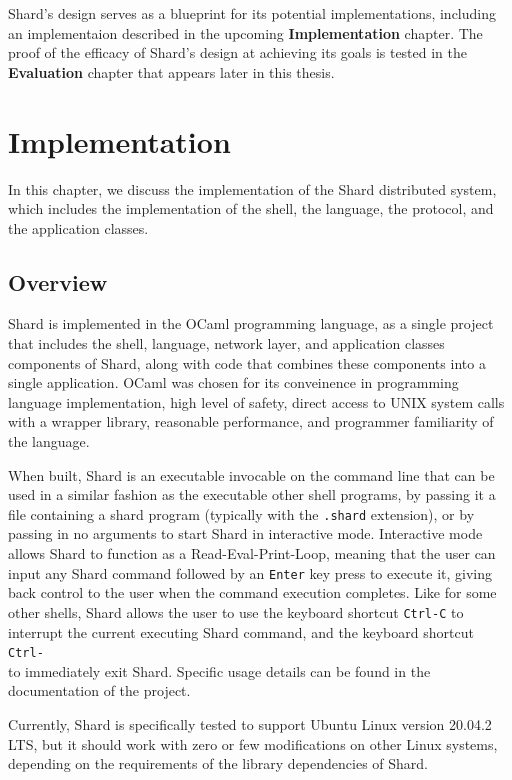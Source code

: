 \documentclass[twoside]{report}
\begin{document}
Shard's design serves as a blueprint for its potential implementations, including an implementaion described in the upcoming \textbf{Implementation} chapter.
The proof of the efficacy of Shard's design at achieving its goals is tested in the \textbf{Evaluation} chapter that appears later in this thesis.


\chapter{Implementation}

In this chapter, we discuss the implementation of the Shard distributed system, which includes the implementation of the shell, the language, the protocol, and the application classes.

\section{Overview}

Shard is implemented in the OCaml programming language, as a single project that includes the shell, language, network layer, and application classes components of Shard, along with code that combines these components into a single application.
OCaml was chosen for its conveinence in programming language implementation, high level of safety, direct access to UNIX system calls with a wrapper library, reasonable performance, and programmer familiarity of the language.

When built, Shard is an executable invocable on the command line that can be used in a similar fashion as the executable other shell programs, by passing it a file containing a shard program (typically with the \texttt{.shard} extension), or by passing in no arguments to start Shard in interactive mode.
Interactive mode allows Shard to function as a Read-Eval-Print-Loop, meaning that the user can input any Shard command followed by an \texttt{Enter} key press to execute it, giving back control to the user when the command execution completes.
Like for some other shells, Shard allows the user to use the keyboard shortcut \texttt{Ctrl-C} to interrupt the current executing Shard command, and the keyboard shortcut \texttt{Ctrl-\\} to immediately exit Shard.
Specific usage details can be found in the documentation of the project.

Currently, Shard is specifically tested to support Ubuntu Linux version 20.04.2 LTS, but it should work with zero or few modifications on other Linux systems, depending on the requirements of the library dependencies of Shard.
\end{document}
